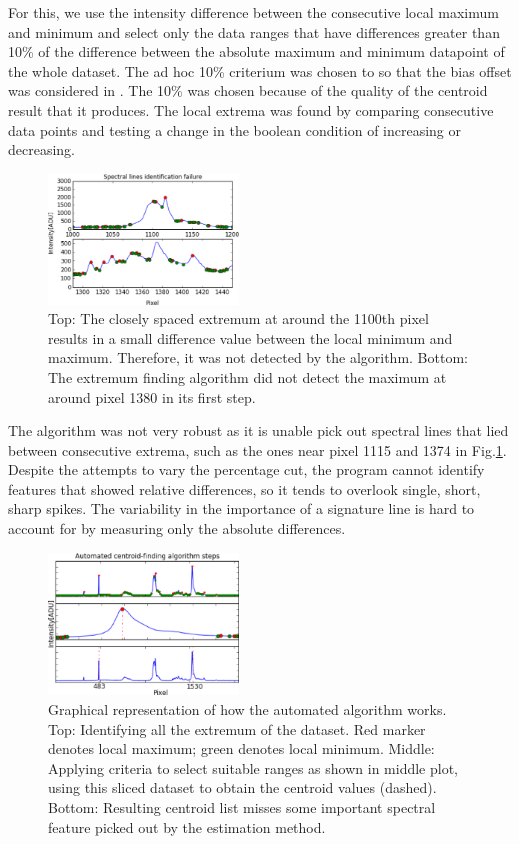 \documentclass[authoryear, 12pt,5p, times]{elsarticle}
\begin{document}
 For this, we use the intensity difference between the consecutive  local maximum and minimum and select only the data ranges that  have  differences greater than 10\% of the difference between the absolute maximum and  minimum datapoint of the whole dataset. The ad hoc 10\% criterium was chosen to so that the bias offset  was considered in . The 10\% was chosen because of the quality of the centroid result that it produces. The local extrema was found by comparing consecutive data points and testing a change in the boolean condition of increasing or decreasing.
\begin{figure}
\includegraphics[width=0.45\textwidth]{figures/fail}
\caption{Top: The closely spaced extremum at around the 1100th pixel results in a small difference value between the local minimum and maximum. Therefore, it was not detected by the algorithm. Bottom: The extremum finding algorithm did not detect the maximum at around pixel 1380 in its  first step.}
\end{figure}


	The algorithm was not very robust as it is unable pick out spectral lines that lied between consecutive extrema, such as the ones near pixel 1115 and 1374 in Fig.\ref{fail}. Despite the attempts to vary the percentage cut, the program cannot identify features that showed relative differences, so it tends to overlook single, short, sharp spikes. The variability in the importance of a signature line  is hard to account for  by measuring only the  absolute differences.
\begin{figure}
\includegraphics[width=0.45\textwidth]{figures/steps}
\caption{Graphical representation of how the automated algorithm works. Top: Identifying all the extremum of the dataset. Red marker denotes local maximum; green denotes local minimum. Middle: Applying criteria to select suitable ranges as shown in middle plot, using this sliced dataset to obtain the centroid values (dashed). Bottom: Resulting centroid list misses some important spectral feature picked out by the estimation method.}\label{fail}
\end{figure}
\end{document}
